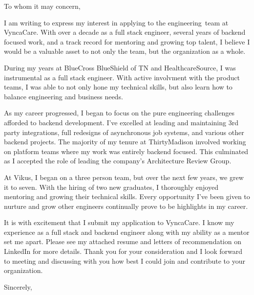 
\usepackage{parskip}

\newcommand{\applyteam}{engineering}
\newcommand{\applycompany}{VyncaCare}
\newcommand{\applyrole}{Staff Software Engineer}





To whom it may concern,

I am writing to express my interest in applying to the \applyteam\ team at \applycompany.
With over a decade as a full stack engineer, several years of backend focused work, and a track record for
mentoring and growing top talent, I believe I would be a valuable asset to not only the team, but the
organization as a whole.

During my years at BlueCross BlueShield of TN and HealthcareSource, I was instrumental as a full stack
engineer. With active involvment with the product teams, I was able to not only hone my technical skills,
but also learn how to balance engineering and business needs.

As my career progressed, I began to focus on the pure engineering challenges afforded to backend development.
I've excelled at leading and maintaining 3rd party integrations, full redesigns of asynchronous job systems,
and various other backend projects. The majority of my tenure at ThirtyMadison involved working on platform
teams where my work was entirely backend focused. This culminated as I accepted the role of leading the
company's Architecture Review Group.

At Vikus, I began on a three person team, but over the next few years, we grew it to seven. With the hiring 
of two new graduates, I thoroughly enjoyed mentoring and growing their technical skills. Every opportunity
I've been given to nurture and grow other engineers continually prove to be highlights in my career.

It is with excitement that I submit my application to \applycompany. I know my experience as a
full stack and backend engineer along with my ability as a mentor set me apart. Please see my attached resume and
letters of recommendation on LinkedIn for more details. Thank you for your consideration and I look forward
to meeting and discussing with you how best I could join and contribute to your organization.

\hfill \break
Sincerely,\\
\name

